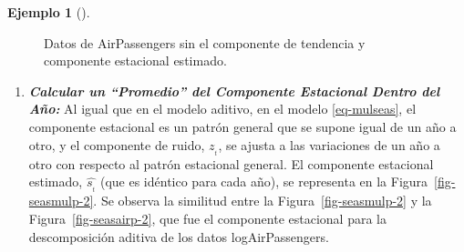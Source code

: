 \documentclass[
  us-letterpaper,
]{scrreprt}
\theoremstyle{plain}
\theoremstyle{definition}
\theoremstyle{definition}
\newtheorem{example}{Ejemplo}[chapter]
\theoremstyle{plain}
\theoremstyle{remark}
\begin{document}
\begin{example}[]
\begin{tcolorbox}
\begin{figure}[H]
\begin{minipage}{0.50\linewidth}
{}


\end{minipage}%
%
\begin{minipage}{0.50\linewidth}



\end{minipage}%

\caption{\label{fig-seasmulp}Datos de AirPassengers sin el componente de
tendencia y componente estacional estimado.}

\end{figure}%

\begin{enumerate}
\def\labelenumi{\alph{enumi}.}
\setcounter{enumi}{2}
\item
  \textbf{\emph{Calcular un ``Promedio'' del Componente Estacional
  Dentro del Año:}} Al igual que en el modelo aditivo, en el modelo
  \ref{eq-mulseas}, el componente estacional es un patrón general que se
  supone igual de un año a otro, y el componente de ruido, \(z_{_t}\),
  se ajusta a las variaciones de un año a otro con respecto al patrón
  estacional general. El componente estacional estimado,
  \(\hat{s_{_t}}\) (que es idéntico para cada año), se representa en la
  Figura~\ref{fig-seasmulp-2}. Se observa la similitud entre la
  Figura~\ref{fig-seasmulp-2} y la Figura~\ref{fig-seasairp-2}, que fue
  el componente estacional para la descomposición aditiva de los datos
  logAirPassengers.


\end{enumerate}
\end{tcolorbox}
\end{example}
\end{document}
